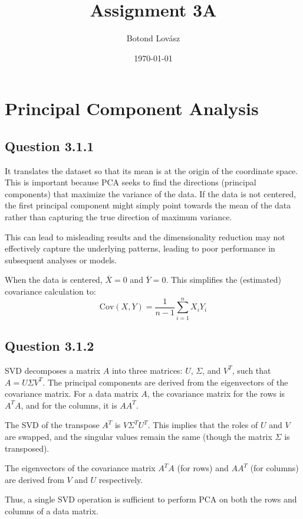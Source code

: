 \documentclass{article}
\title{Assignment 3A}
\author{Botond Lovász}
\date{\today}
\begin{document}
\maketitle

\section{Principal Component Analysis}

\subsection{Question 3.1.1}


It translates the dataset so that its mean is at the origin of the coordinate space. This is important because PCA seeks to find the directions (principal components) that maximize the variance of the data. If the data is not centered, the first principal component might simply point towards the mean of the data rather than capturing the true direction of maximum variance.

This can lead to misleading results and the dimensionality reduction may not effectively capture the underlying patterns, leading to poor performance in subsequent analyses or models.
    
When the data is centered, \(\bar{X} = 0\) and \(\bar{Y} = 0\). This simplifies the (estimated) covariance calculation to:
\[
\text{Cov}(X, Y) = \frac{1}{n-1} \sum_{i=1}^{n} X_i Y_i
\]


\subsection{Question 3.1.2}

SVD decomposes a matrix \( A \) into three matrices: \( U \), \( \Sigma \), and \( V^T \), such that \( A = U \Sigma V^T \). The principal components are derived from the eigenvectors of the covariance matrix. For a data matrix \( A \), the covariance matrix for the rows is \( A^T A \), and for the columns, it is \( A A^T \).

The SVD of the transpose \( A^T \) is \( V \Sigma^T U^T \). This implies that the roles of \( U \) and \( V \) are swapped, and the singular values remain the same (though the matrix \( \Sigma \) is transposed).

The eigenvectors of the covariance matrix \( A^T A \) (for rows) and \( A A^T \) (for columns) are derived from \( V \) and \( U \) respectively.

Thus, a single SVD operation is sufficient to perform PCA on both the rows and columns of a data matrix. 
\end{document}
